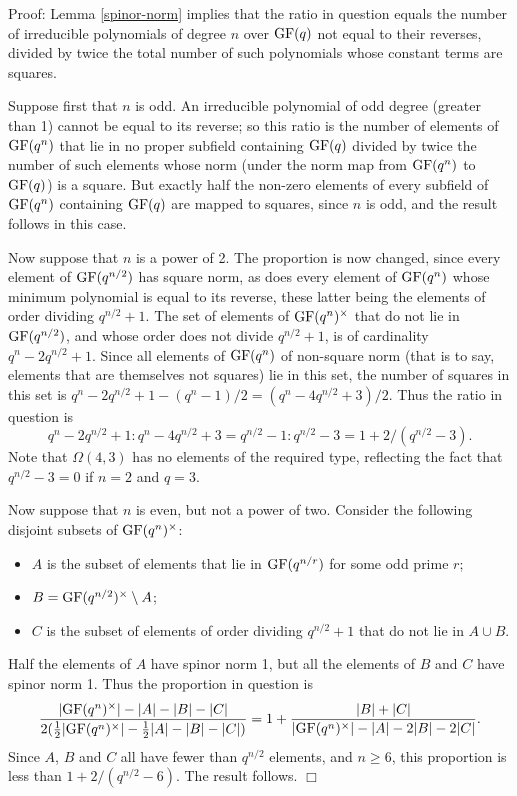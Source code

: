 \documentclass[12pt]{article}
\newenvironment{proof}{\normalsize {\sc Proof}:}{{\hfill $\Box$ \\}}
\def\GF{{\rm GF}}
\begin{document}
\begin{proof}
Lemma \ref{spinor-norm} implies that the ratio in question
equals the number of irreducible polynomials of degree
$n$ over $\GF(q)$ not equal to their reverses, divided by twice the 
total number of  such polynomials whose constant terms are squares. 

Suppose first that $n$ is odd.  An irreducible polynomial of 
odd degree (greater than 1) cannot be equal to its reverse; so
this ratio is the number of elements of $\GF(q^n)$ that lie in no 
proper subfield containing $\GF(q)$ divided by twice the number of 
such elements
whose norm (under the norm map from $\GF(q^n)$ to $\GF(q)$) is a square.  
But exactly half the non-zero elements of every subfield of $\GF(q^n)$
containing $\GF(q)$ are mapped to squares, since $n$ is odd, and the 
result follows in this case.

Now suppose that $n$ is a power of 2.  The proportion is now changed, since 
every element of $\GF(q^{n/2})$ has square norm, as does
every element of $\GF(q^n)$ whose minimum polynomial is equal to its reverse, 
these latter being the elements of order dividing $q^{n/2}+1$. 
The set of elements of $\GF(q^n)^\times$ that do not lie in $\GF(q^{n/2})$, 
and whose order does not divide $q^{n/2}+1$, is of cardinality 
$q^n-2q^{n/2} + 1$.
Since all elements of $\GF(q^n)$ of non-square norm (that is to say, 
elements that are themselves not squares) lie in this set, the number of
squares in this set is $q^n-2q^{n/2}+1-(q^n-1)/2=(q^n-4q^{n/2}+3)/2$.  
Thus the ratio in question is 
$$q^n-2q^{n/2} + 1:q^n-4q^{n/2}+3=
q^{n/2}-1:q^{n/2}-3=1+2/(q^{n/2}-3).$$
Note that $\Omega(4,3)$ has no elements of the required type, reflecting
the fact that $q^{n/2}-3=0$ if $n=2$ and $q=3$.

Now suppose that $n$ is even, but not a power of two.  
Consider the following
disjoint subsets of $\GF(q^n)^\times$:  
\begin{itemize}
\item $A$ is the subset of elements that lie in
$\GF(q^{n/r})$ for some odd prime $r$;  
\item $B=\GF(q^{n/2})^\times \setminus A$;
\item $C$ is the subset of elements of order dividing 
$q^{n/2}+1$ that do not lie in $A\cup B$.
\end{itemize}
Half the elements of $A$ have spinor norm 1, but all the 
elements of $B$ and $C$ have 
spinor norm 1.  Thus the proportion in question is
$${|\GF(q^n)^\times|-|A|-|B|-
|C|\over2({1\over2}|\GF(q^n)^\times|-{1\over2}|A|-|B|-|C|)}
=1+{|B|+|C|\over|\GF(q^n)^\times|-|A|-2|B|-2|C|}.$$
Since $A$, $B$ and $C$ all have fewer than $q^{n/2}$ elements, 
and $n\ge6$, this proportion is less than 
$1 + 2/(q^{n/2}-6)$. The result follows.
\end{proof}
\end{document}
